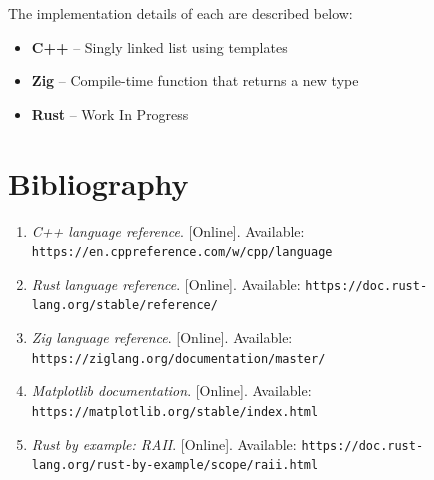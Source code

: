 \documentclass{article}
\begin{document}
The implementation details of each are described below:
\begin{itemize}
    \item \textbf{C++} – Singly linked list using templates
    \item \textbf{Zig} – Compile-time function that returns a new type
    \item \textbf{Rust} – Work In Progress
\end{itemize}

\clearpage
\section{Bibliography}
\begin{enumerate}
    \item \textit{C++ language reference}. [Online]. Available: \texttt{https://en.cppreference.com/w/cpp/language}
    \item \textit{Rust language reference}. [Online]. Available: \texttt{https://doc.rust-lang.org/stable/reference/}
    \item \textit{Zig language reference}. [Online]. Available: \texttt{https://ziglang.org/documentation/master/}
    \item \textit{Matplotlib documentation}. [Online]. Available: \texttt{https://matplotlib.org/stable/index.html}
    \item \textit{Rust by example: RAII}. [Online]. Available: \texttt{https://doc.rust-lang.org/rust-by-example/scope/raii.html}
\end{enumerate}
\end{document}
